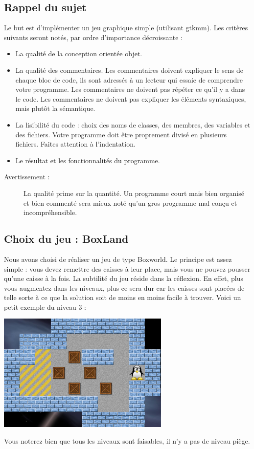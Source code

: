 \documentclass[a4paper,11pt,oneside]{article}
\begin{document}
\subsection{Rappel du sujet}
Le but est d'implémenter un jeu graphique simple (utilisant gtkmm).
Les critères suivants seront notés, par ordre d'importance décroissante :
\begin{itemize}
	\item La qualité de la conception orientée objet.
	\item La qualité des commentaires. Les commentaires doivent expliquer le sens de chaque bloc de code, ils sont
	adressés à un lecteur qui essaie de comprendre votre programme. Les commentaires ne doivent pas répéter ce qu'il
	y a dans le code. Les commentaires ne doivent pas expliquer les éléments syntaxiques, mais plutôt la sémantique.
	\item La lisibilité du code : choix des noms de classes, des membres, des variables et des fichiers. Votre programme
	doit être proprement divisé en plusieurs fichiers. Faites attention à l'indentation.
	\item Le résultat et les fonctionnalités du programme.
\end{itemize}
\begin{description}
	\item[Avertissement : ]La qualité prime sur la quantité. Un programme court mais bien organisé et bien commenté sera
	mieux noté qu'un gros programme mal conçu et incompréhensible.
\end{description}

\subsection{Choix du jeu : BoxLand}
Nous avons choisi de réaliser un jeu de type Boxworld. Le principe est assez simple : vous devez remettre des caisses à leur place,
mais vous ne pouvez pousser qu'une caisse à la fois.
La subtilité du jeu réside dans la réflexion. En effet, plus vous augmentez dans les niveaux, plus ce sera dur car les caisses sont
placées de telle sorte à ce que la solution soit de moins en moins facile à trouver. Voici un petit exemple du niveau 3 :
\begin{center}
\includegraphics[keepaspectratio=true]{capture}
\end{center}
Vous noterez bien que tous les niveaux sont faisables, il n'y a pas de niveau piège.
\end{document}
